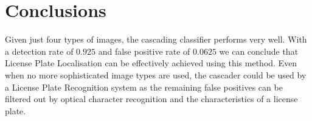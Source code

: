 \documentclass[a4paper,11pt]{article}
\begin{document}
\section{Conclusions} \label{sec:conc}
Given just four types of images, the cascading classifier performs very well.
With a detection rate of $0.925$ and false positive rate of $0.0625$ we can
conclude that License Plate Localisation can be effectively achieved using this
method. Even when no more sophisticated image types are used, the cascader
could be used by a License Plate Recognition system as the remaining false
positives can be filtered out by optical character recognition and the
characteristics of a license plate.
\newpage
\renewcommand\bibname{References}


\end{document}
